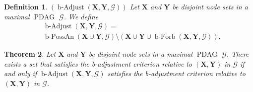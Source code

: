 \documentclass[letterpaper]{article}
\newtheorem{theorem}{Theorem}[section]
\newtheorem{definition}[theorem]{Definition}
\theoremstyle{definition}
\theoremstyle{remark}
\DeclareMathOperator{\PDAG}{PDAG}
\DeclareMathOperator{\bPossAn}{b-PossAn}
\DeclareMathOperator{\bForbb}{b-Forb}
\DeclareMathOperator{\bAdjust}{b-Adjust}
\newcommand{\mpdag}{maximal $\PDAG$}
\newcommand{\g}[1][G]{\mathcal{#1}}
\newcommand{\badjustb}[2][X,Y]{\bAdjust(\mathbf{#1},#2)}
\newcommand{\bfb}[2][X,Y]{\bForbb(\mathbf{#1},#2)}
\begin{document}
\begin{definition}$(\badjustb{\g})$
Let $\mathbf{X}$ and $\mathbf{Y}$ be disjoint node sets in a \mpdag{} $\g$. We define
\begin{align}
&\badjustb{\g}=  \nonumber \\
&\bPossAn(\mathbf{X} \cup \mathbf{Y}, \g)\setminus(\mathbf{X} \cup \mathbf{Y} \cup \bfb{\g}). \nonumber
\end{align}
\label{def:constr-set-mpdag}
\end{definition}
\vspace{-.4cm}
\begin{theorem}
 Let $\mathbf{X}$ and $\mathbf{Y}$ be disjoint node sets in a \mpdag{} $\g$. There exists a set that satisfies the b-adjustment criterion relative to $(\mathbf{X,Y})$ in $\g$ if and only if $\badjustb{\g}$ satisfies the b-adjustment criterion relative to $(\mathbf{X,Y})$ in $\g$.
\label{theorem:constructive-set-mpdag}
\end{theorem}
\end{document}
